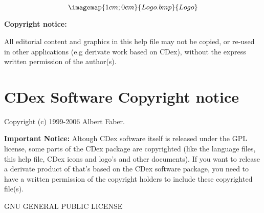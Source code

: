 %

\newcommand{\commandref}[2]{\helpref{{\tt $\backslash$#1}}{#2}}%
\newcommand{\commandrefn}[2]{\helprefn{{\tt $\backslash$#1}}{#2}\index{#1}}%
\newcommand{\commandpageref}[2]{\latexignore{\helprefn{{\tt $\backslash$#1}}{#2}}\latexonly{{\tt $\backslash$#1} {\it page \pageref{#2}}}\index{#1}}%
\newcommand{\indexit}[1]{#1\index{#1}}%
\newcommand{\inioption}[1]{{\bf {\tt #1}}\index{#1}}%
\parskip=10pt%
\parindent=0pt%
%
%
\makeindex%
%
\maketitle%
$$\imagemap{1cm;0cm}{Logo.bmp}{Logo}$$
\pagestyle{fancyplain}%
%
%
%
\setfooter{\thepage}{}{}{}{}{\thepage}%

{\bf Copyright notice:}

All editorial content and graphics in this help file may not be copied, 
or re-used in other applications (e.g derivate work based on CDex), without the 
express written permission of the author(s).

\tableofcontents%


\chapter*{CDex Software Copyright notice}%
%
\setfooter{\thepage}{}{}{}{}{\thepage}%

Copyright (c) 1999-2006 Albert Faber.


{\bf Important Notice:}
Altough CDex software itself is released under the GPL license, some
parts of the CDex package are copyrighted (like the language files, this
help file, CDex icons and logo's and other documents). If you want to release a derivate product of 
that's based on the CDex software package, you need to have a written permission
of the copyright holders to include these copyrighted file(s).


		    GNU GENERAL PUBLIC LICENSE
		    
